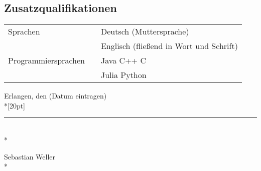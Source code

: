 \subsection*{Zusatzqualifikationen}
\begin{tabular}{lcl}
Sprachen            &  & Deutsch (Muttersprache)\\
                    &  & Englisch (fließend in Wort und Schrift)\\[5pt]
Programmiersprachen &  & Java \quad C++ \quad C \\
					&  & Julia \quad Python
\end{tabular} 
\bigskip
\vspace*{.5cm}




Erlangen, den (Datum eintragen)\\*[20pt]\nopagebreak
\vspace{0.5cm}


\rule{5cm}{0.4pt}\\*\nopagebreak


Sebastian Weller\\*\nopagebreak



